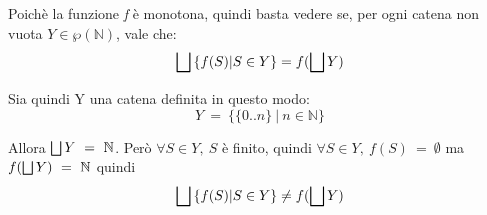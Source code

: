 {    Poichè la funzione \textit{f} è monotona, quindi basta vedere se, per ogni
    catena non vuota $Y\in\wp{(\mathbb{N})}$, vale che:
    \[\bigsqcup{} \{f(S) | S \in{}Y\} = f(\bigsqcup{}Y)\]
    

    Sia quindi Y una catena definita in questo modo:
    \[
    Y~=~\{\{0..n\}~|~n\in\mathbb{N}\}
    \]

    Allora $\bigsqcup{}Y~=~\mathbb{N}$. Però $\forall{}S\in{}Y,~S$ è finito, quindi
    $\forall{}S\in{}Y,~f(S)~=~\emptyset$ ma $f(\bigsqcup{}Y)~=~\mathbb{N}$ quindi 
    \[\bigsqcup{} \{f(S) | S \in{}Y\} \neq f(\bigsqcup{}Y)\]
%
}
\newpage